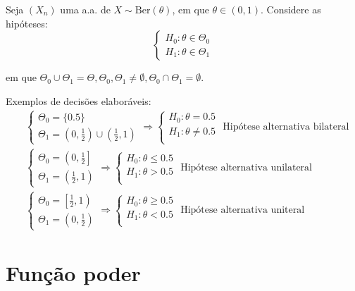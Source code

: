 \documentclass[
  letterpaper,
  DIV=11,
  numbers=noendperiod]{scrreprt}
\begin{document}
Seja \((X_{n})\) uma a.a. de \(X\sim\mathrm{Ber}(\theta)\), em que
\(\theta \in (0,1)\). Considere as hipóteses: \[
\begin{cases}
H_{0}: \theta \in \Theta_{0} \\
H_{1}: \theta \in \Theta_{1}
\end{cases}
\]

em que
\(\Theta_{0} \cup \Theta_{1} = \Theta, \Theta_{0},\Theta_{1} \neq \emptyset, \Theta_{0}\cap\Theta_{1}= \emptyset\).

Exemplos de decisões elaboráveis: \[
\begin{aligned}
&\begin{cases}
\Theta_{0}=\{ 0.5 \} \\
\Theta_{1} = \left( 0, \frac{1}{2} \right) \cup \left( \frac{1}{2}, 1 \right)
\end{cases} \Rightarrow
\begin{cases}
H_{0}: \theta=0.5 \\
H_{1}: \theta \neq 0.5 \\
\end{cases} \text{ Hipótese alternativa bilateral} \\
&\begin{cases}
\Theta_{0}= \left(  0, \frac{1}{2} \right] \\
\Theta_{1} = \left( \frac{1}{2}, 1 \right)
\end{cases} \Rightarrow
\begin{cases}
H_{0}: \theta \leq 0.5\\
H_{1}: \theta > 0.5 \\
\end{cases} \text{ Hipótese alternativa unilateral} \\
&\begin{cases}
\Theta_{0}= \left[ \frac{1}{2}, 1\right)   \\
\Theta_{1} = \left( 0, \frac{1}{2} \right)
\end{cases} \Rightarrow
\begin{cases}
H_{0}: \theta \geq 0.5 \\
H_{1}: \theta < 0.5 \\
\end{cases} \text{ Hipótese alternativa uniteral}
\end{aligned}
\]

\section{Função poder}\label{funuxe7uxe3o-poder}
\end{document}
